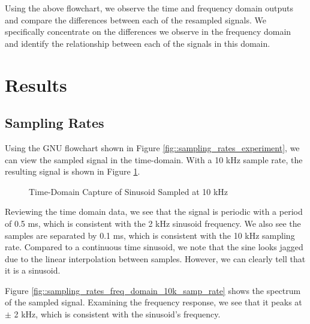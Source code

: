 \documentclass{article}
\begin{document}
Using the above flowchart, we observe the time and frequency domain outputs and compare the differences between each of the resampled signals. We specifically concentrate on the differences we observe in the frequency domain and identify the relationship between each of the signals in this domain.

\section{Results}

\subsection{Sampling Rates}

Using the GNU flowchart shown in Figure \ref{fig::sampling_rates_experiment}, we can view the sampled signal in the time-domain. With a 10 kHz sample rate, the resulting signal is shown in Figure \ref{fig::sampling_rates_time_domain_10k_samp_rate}.

\begin{figure}[H]
	\centerline{}
	\caption{Time-Domain Capture of Sinusoid Sampled at 10 kHz}
	\label{fig::sampling_rates_time_domain_10k_samp_rate}
\end{figure}

Reviewing the time domain data, we see that the signal is periodic with a period of 0.5 ms, which is consistent with the 2 kHz sinusoid frequency. We also see the samples are separated by 0.1 ms, which is consistent with the 10 kHz sampling rate. Compared to a continuous time sinusoid, we note that the sine looks jagged due to the linear interpolation between samples. However, we can clearly tell that it is a sinusoid.

Figure \ref{fig::sampling_rates_freq_domain_10k_samp_rate} shows the spectrum of the sampled signal. Examining the frequency response, we see that it peaks at $\pm$ 2 kHz, which is consistent with the sinusoid's frequency.
\end{document}
